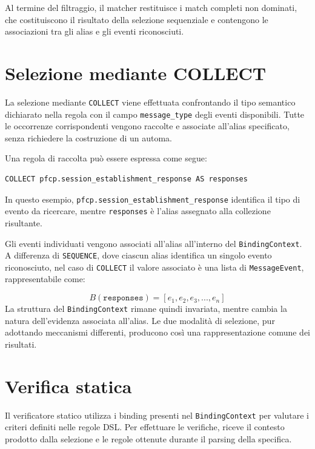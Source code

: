 Al termine del filtraggio, il matcher restituisce i match completi non dominati, che costituiscono il risultato della selezione sequenziale e contengono le associazioni tra gli alias e gli eventi riconosciuti.

\section{Selezione mediante COLLECT}\label{selezione-mediante-collect}

La selezione mediante \texttt{COLLECT} viene effettuata confrontando il tipo semantico dichiarato nella regola con il campo \texttt{message\_type} degli eventi disponibili. Tutte le occorrenze corrispondenti vengono raccolte e associate all'alias specificato, senza richiedere la costruzione di un automa.

Una regola di raccolta può essere espressa come segue:

\par\noindent\begin{minipage}{\linewidth}
\begin{lstlisting}
COLLECT pfcp.session_establishment_response AS responses
\end{lstlisting}
\end{minipage}\par

In questo esempio, \texttt{pfcp.session\_establishment\_response} identifica il tipo di evento da ricercare, mentre \texttt{responses} è l'alias assegnato alla collezione risultante.

Gli eventi individuati vengono associati all'alias all'interno del \texttt{BindingContext}. A differenza di \texttt{SEQUENCE}, dove ciascun alias identifica un singolo evento riconosciuto, nel caso di \texttt{COLLECT} il valore associato è una lista di \texttt{MessageEvent}, rappresentabile come:

\[
B(\texttt{responses}) = [e_1, e_2, e_3, ..., e_n]
\] La struttura del \texttt{BindingContext} rimane quindi invariata, mentre cambia la natura dell'evidenza associata all'alias. Le due modalità di selezione, pur adottando meccanismi differenti, producono così una rappresentazione comune dei risultati.

\section{Verifica statica}\label{verifica-statica}

Il verificatore statico utilizza i binding presenti nel \texttt{BindingContext} per valutare i criteri definiti nelle regole DSL. Per effettuare le verifiche, riceve il contesto prodotto dalla selezione e le regole ottenute durante il parsing della specifica.

